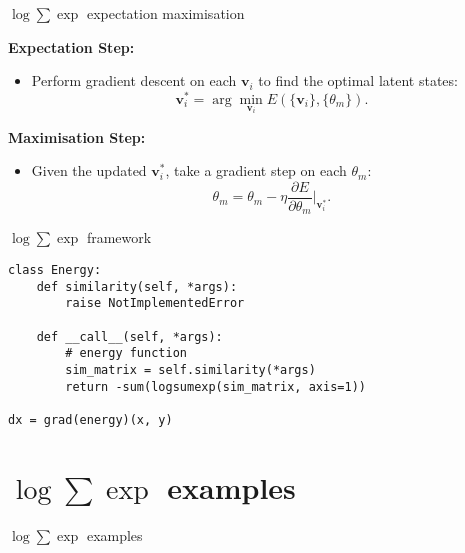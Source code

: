 \documentclass{beamer}
\begin{document}
\begin{frame}{$\log \sum \exp$ expectation maximisation}
    \bigskip

    \textbf{Expectation Step:} 
    \begin{itemize}
        \item Perform gradient descent on each \(\bm{v}_i\) to find the optimal latent states:
        \[
        \bm{v}_i^* = \arg \min_{\bm{v}_i} E(\{\bm{v}_i\}, \{\theta_m\}).
        \]
    \end{itemize}

    \bigskip

    \textbf{Maximisation Step:} 
    \begin{itemize}
        \item Given the updated \(\bm{v}_i^*\), take a gradient step on each \(\theta_m\):
        \[
        \theta_m = \theta_m - \eta \frac{\partial E}{\partial \theta_m} \Big|_{\bm{v}_i^*}.
        \]
    \end{itemize}

\end{frame}


\begin{frame}[fragile]{$\log \sum \exp$ framework}

\begin{verbatim}
class Energy:
    def similarity(self, *args):
        raise NotImplementedError

    def __call__(self, *args):
        # energy function
        sim_matrix = self.similarity(*args) 
        return -sum(logsumexp(sim_matrix, axis=1))

dx = grad(energy)(x, y)
\end{verbatim}
\end{frame}


\section{$\log \sum \exp$ examples}

\begin{frame}
    \centering
    \Huge $\log \sum \exp$ examples
\end{frame}
\end{document}
